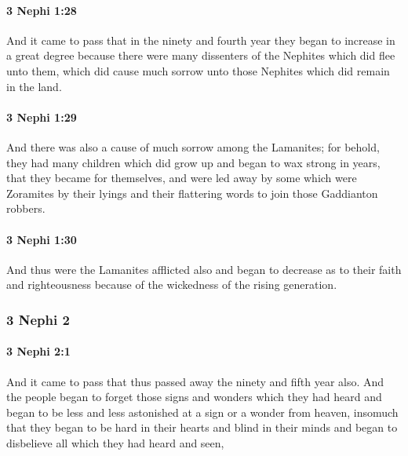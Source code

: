 		\paragraph{3 Nephi 1:28} %
			\label{3NEPHI-1-28}

			And it came to pass that in the ninety and fourth year
			they began to increase in a great degree
			because there were many dissenters of the Nephites which did flee unto them,
			which did cause much sorrow unto those Nephites which did remain in the land.

		\paragraph{3 Nephi 1:29} %
			\label{3NEPHI-1-29}

			And there was also a cause of much sorrow among the Lamanites;
			for behold, they had many children
			which did grow up and began to wax strong in years,
			that they became for themselves,
			and were led away by some which were Zoramites
			by their lyings and their flattering words to join those Gaddianton robbers.

		\paragraph{3 Nephi 1:30} %
			\label{3NEPHI-1-30}

			And thus were the Lamanites afflicted also
			and began to decrease as to their faith and righteousness
			because of the wickedness of the rising generation.

	\subsubsection{3 Nephi 2} %
		\label{3NEPHI-2}
		
		\paragraph{3 Nephi 2:1} %
			\label{3NEPHI-2-1}

			And it came to pass that thus passed away the ninety and fifth year also.
			And the people began to forget those signs and wonders which they had heard
			and began to be less and less astonished at a sign or a wonder from heaven,
			insomuch that they began to be hard in their hearts and blind in their minds
			and began to disbelieve all which they had heard and seen,

